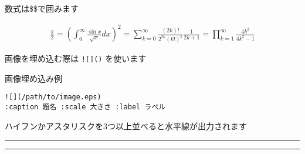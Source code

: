 \documentclass[a4j]{jarticle}
\begin{document}
数式は\$\$で囲みます

\begin{eqnarray*}
\frac{\pi}{2}
= \left( \int_{0}^{\infty} \frac{\sin x}{\sqrt{x}} dx \right)^2 
= \sum_{k=0}^{\infty} \frac{(2k)!}{2^{2k}(k!)^2} \frac{1}{2k+1} 
= \prod_{k=1}^{\infty} \frac{4k^2}{4k^2 - 1}
\end{eqnarray*}

画像を埋め込む際は {\tt ![]()} を使います

\begin{itembox}[c]{画像埋め込み例}
\begin{verbatim}
![](/path/to/image.eps)
:caption 題名 :scale 大きさ :label ラベル
\end{verbatim}
\end{itembox}

ハイフンかアスタリスクを3つ以上並べると水平線が出力されます

\begin{center}
\rule{3in}{0.4pt}
\end{center}

\begin{center}
\rule{3in}{0.4pt}
\end{center}
\end{document}
